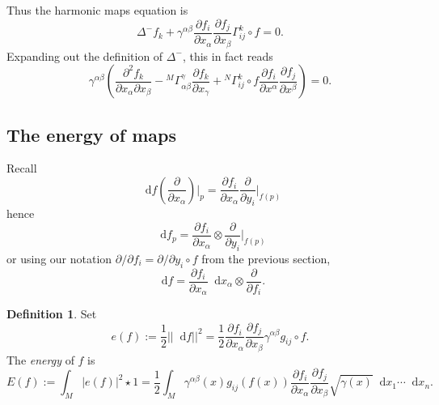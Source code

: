 \documentclass[reqno,12pt,letterpaper]{amsart}
\newcommand*\dif{\mathop{}\!\mathrm{d}}
\newcommand{\dfn}[1]{\emph{#1}\index{#1}}
\newcommand{\parl}{\left(}
\newcommand{\parr}{\right)}
\theoremstyle{definition}
\newtheorem{definition}[theorem]{Definition}
\numberwithin{equation}{section}
\begin{document}
Thus the harmonic maps equation is 
\begin{equation}
\Delta^- f_k + \gamma^{\alpha \beta} \frac{\partial f_i}{\partial x_\alpha} \frac{\partial f_j}{\partial x_\beta} \Gamma_{ij}^k \circ f = 0.
\end{equation}
Expanding out the definition of $\Delta^-$, this in fact reads
\begin{equation}
\gamma^{\alpha \beta} \parl \frac{\partial^2 f_k}{\partial x_\alpha \partial x_\beta} - {}^M \Gamma_{\alpha \beta}^\gamma \frac{\partial f_k}{\partial x_\gamma} + {}^N \Gamma_{ij}^k \circ f \frac{\partial f_i}{\partial x^\alpha} \frac{\partial f_j}{\partial x^\beta} \parr = 0.
\end{equation}

\subsection{The energy of maps}
Recall 
$$\dif f \parl \frac{\partial}{\partial x_\alpha} \parr \bigg|_p = \frac{\partial f_i}{\partial x_\alpha} \frac{\partial}{\partial y_i} \bigg|_{f(p)}$$
hence 
$$\dif f_p = \frac{\partial f_i}{\partial x_\alpha} \otimes \frac{\partial}{\partial y_i} \bigg|_{f(p)}$$
or using our notation $\partial/\partial f_i = \partial/\partial y_i \circ f$ from the previous section,
$$\dif f = \frac{\partial f_i}{\partial x_\alpha} \dif x_\alpha \otimes \frac{\partial}{\partial f_i}.$$

\begin{definition}
Set 
$$e(f) := \frac{1}{2} ||\dif f||^2 = \frac{1}{2} \frac{\partial f_i}{\partial x_\alpha} \frac{\partial f_j}{\partial x_\beta} \gamma^{\alpha \beta} g_{ij} \circ f.$$
The \dfn{energy} of $f$ is 
$$E(f) := \int_M |e(f)|^2 \star 1 = \frac{1}{2} \int_M \gamma^{\alpha \beta}(x) g_{ij}(f(x)) \frac{\partial f_i}{\partial x_\alpha} \frac{\partial f_j}{\partial x_\beta} \sqrt{\gamma(x)} \dif x_1 \cdots \dif x_n.$$
\end{definition}
\end{document}
